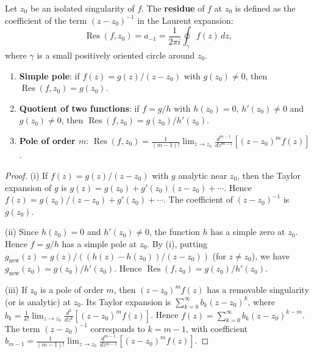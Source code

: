 \begin{definition}[Residue]\label{def:ca_residue}
Let $z_0$ be an isolated singularity of $f$. The \textbf{residue} of $f$ at $z_0$ is defined as the coefficient of the term $(z - z_0)^{-1}$ in the Laurent expansion:
\[
\operatorname{Res}(f, z_0) = a_{-1} = \frac{1}{2\pi i} \oint_\gamma f(z) \, dz,
\]
where $\gamma$ is a small positively oriented circle around $z_0$.
\end{definition}

\begin{proposition}\label{prop:ca_residue_calculation}
\begin{enumerate}[label=(\roman*)]
    \item \textbf{Simple pole}: if $f(z) = g(z)/(z - z_0)$ with $g(z_0) \neq 0$, then $\operatorname{Res}(f, z_0) = g(z_0)$.
    \item \textbf{Quotient of two functions}: if $f = g/h$ with $h(z_0) = 0$, $h'(z_0) \neq 0$ and $g(z_0) \neq 0$, then $\operatorname{Res}(f, z_0) = g(z_0)/h'(z_0)$.
    \item \textbf{Pole of order $m$}: $\operatorname{Res}(f, z_0) = \frac{1}{(m-1)!} \lim_{z \to z_0} \frac{d^{m-1}}{dz^{m-1}} [(z - z_0)^m f(z)]$.
\end{enumerate}
\end{proposition}

\begin{proof}
(i) If $f(z) = g(z)/(z - z_0)$ with $g$ analytic near $z_0$, then the Taylor expansion of $g$ is $g(z) = g(z_0) + g'(z_0)(z - z_0) + \cdots$. Hence $f(z) = g(z_0)/(z - z_0) + g'(z_0) + \cdots$. The coefficient of $(z - z_0)^{-1}$ is $g(z_0)$.

(ii) Since $h(z_0) = 0$ and $h'(z_0) \neq 0$, the function $h$ has a simple zero at $z_0$. Hence $f = g/h$ has a simple pole at $z_0$. By (i), putting $g_{\text{new}}(z) = g(z)/((h(z) - h(z_0))/(z - z_0))$ (for $z \neq z_0$), we have $g_{\text{new}}(z_0) = g(z_0)/h'(z_0)$. Hence $\operatorname{Res}(f, z_0) = g(z_0)/h'(z_0)$.

(iii) If $z_0$ is a pole of order $m$, then $(z - z_0)^m f(z)$ has a removable singularity (or is analytic) at $z_0$. Its Taylor expansion is $\sum_{k=0}^{\infty} b_k (z - z_0)^k$, where $b_k = \frac{1}{k!} \lim_{z \to z_0} \frac{d^k}{dz^k} [(z - z_0)^m f(z)]$. Hence $f(z) = \sum_{k=0}^{\infty} b_k (z - z_0)^{k-m}$. The term $(z - z_0)^{-1}$ corresponds to $k = m-1$, with coefficient $b_{m-1} = \frac{1}{(m-1)!} \lim_{z \to z_0} \frac{d^{m-1}}{dz^{m-1}} [(z - z_0)^m f(z)]$.
\end{proof}

